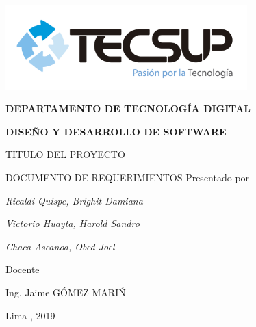 \begin{titlepage}
	\centering
	\includegraphics[width=0.70\textwidth]{img/logo_tecsup_final}\par\vspace{1cm}
	\vspace{0.30cm}	
	{\scshape\large\bfseries DEPARTAMENTO DE TECNOLOG\'IA DIGITAL \par}
	\vspace{0.60cm}	
	{\scshape\large\bfseries DISEÑO Y DESARROLLO DE SOFTWARE  \par}
	\vspace{2.00cm}		
	{\large\large TITULO DEL PROYECTO \par}
	\vspace{0.60cm}
	{\scshape\large DOCUMENTO DE REQUERIMIENTOS }
	\vspace{0.60cm}
	\vfill
	Presentado por \par
	{\large\itshape { Ricaldi Quispe, Brighit Damiana}\par}
	\vspace{0.20cm}
	{\large\itshape { Victorio Huayta, Harold Sandro}\par}
	\vspace{0.20cm}
	{\large\itshape { Chaca Ascanoa, Obed Joel}\par}
	\vspace{0.30cm}
	\vfill
	Docente \par
	Ing. Jaime  \textsc{ G\'OMEZ MARI\'N}
	
  \vspace{0.30cm}
	\vfill
        {\large Lima , 2019 \par}
\end{titlepage}

